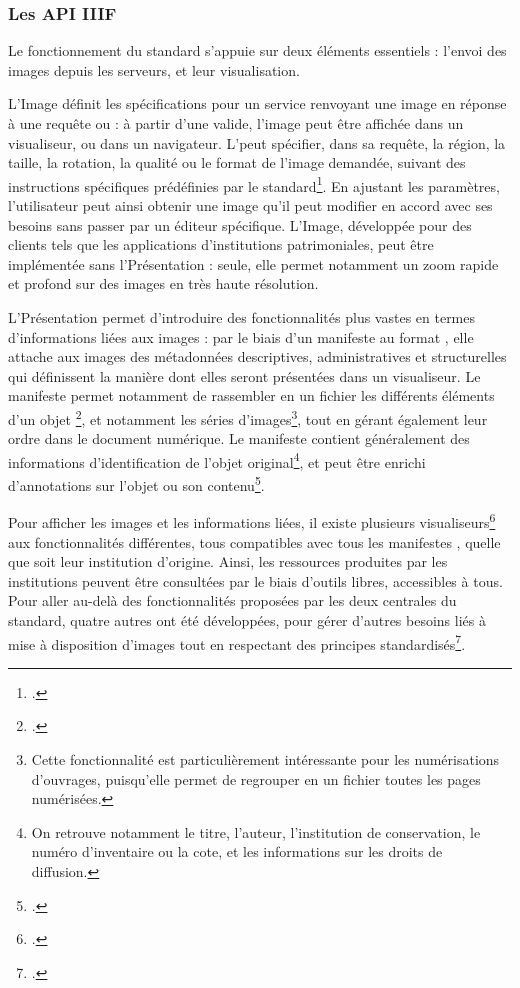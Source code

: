     \subsubsection{Les API IIIF}
	Le fonctionnement du standard \iiif s'appuie sur deux éléments essentiels : l'envoi des images depuis les serveurs, et leur visualisation. 
	
	L'\api Image définit les spécifications pour un service renvoyant une image en réponse à une requête \http ou \https : à partir d'une \uri valide, l'image peut être affichée dans un visualiseur, ou dans un navigateur. L'\uri peut spécifier, dans sa requête, la région, la taille, la rotation, la qualité ou le format de l'image demandée, suivant des instructions spécifiques prédéfinies par le standard\footcite{ImageAPI}. En ajustant les paramètres, l'utilisateur peut ainsi obtenir une image qu'il peut modifier en accord avec ses besoins sans passer par un éditeur spécifique. L'\api Image, développée pour des clients tels que les applications d'institutions patrimoniales, peut être implémentée sans l'\api Présentation : seule, elle permet notamment un zoom rapide et profond sur des images en très haute résolution.
	
	L'\api Présentation permet d'introduire des fonctionnalités plus vastes en termes d'informations liées aux images : par le biais d'un manifeste au format \json, elle attache aux images des métadonnées descriptives, administratives et structurelles qui définissent la manière dont elles seront présentées dans un visualiseur. Le manifeste permet notamment de rassembler en un fichier les différents éléments d'un objet \iiif\footcite{HowItWorks}, et notamment les séries d'images\footnote{Cette fonctionnalité est particulièrement intéressante pour les numérisations d'ouvrages, puisqu'elle permet de regrouper en un fichier toutes les pages numérisées.}, tout en gérant également leur ordre dans le document numérique. Le manifeste contient généralement des informations d'identification de l'objet original\footnote{On retrouve notamment le titre, l'auteur, l'institution de conservation, le numéro d'inventaire ou la cote, et les informations sur les droits de diffusion.}, et peut être enrichi d'annotations sur l'objet ou son contenu\footcite{PresentationAPI}.
	
	Pour afficher les images et les informations liées, il existe plusieurs visualiseurs\footcite{IIIFViewers} aux fonctionnalités différentes, tous compatibles avec tous les manifestes \iiif, quelle que soit leur institution d'origine. Ainsi, les ressources produites par les institutions peuvent être consultées par le biais d'outils libres, accessibles à tous. Pour aller au-delà des fonctionnalités proposées par les deux \api centrales du standard, quatre autres \api ont été développées, pour gérer d'autres besoins liés à mise à disposition d'images tout en respectant des principes standardisés\footcite{HowItWorks}.
    
